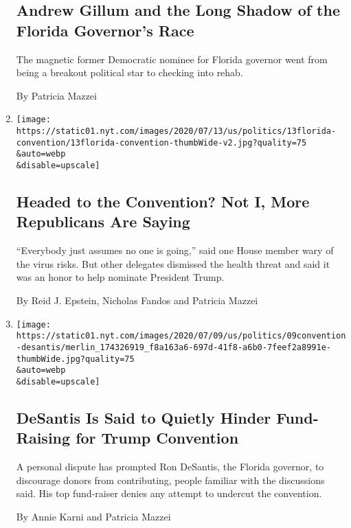 \begin{enumerate}
  \hypertarget{andrew-gillum-and-the-long-shadow-of-the-florida-governors-race}{%
  \subsection{Andrew Gillum and the Long Shadow of the Florida
  Governor's
  Race}\label{andrew-gillum-and-the-long-shadow-of-the-florida-governors-race}}

  The magnetic former Democratic nominee for Florida governor went from
  being a breakout political star to checking into rehab.

  By Patricia Mazzei
\item
  \href{/2020/07/13/us/politics/florida-virus-republican-convention.html}{}

  \texttt{[image: https://static01.nyt.com/images/2020/07/13/us/politics/13florida-convention/13florida-convention-thumbWide-v2.jpg?quality=75\\\&auto=webp\\\&disable=upscale]}

  \hypertarget{headed-to-the-convention-not-i-more-republicans-are-saying}{%
  \subsection{Headed to the Convention? Not I, More Republicans Are
  Saying}\label{headed-to-the-convention-not-i-more-republicans-are-saying}}

  ``Everybody just assumes no one is going,'' said one House member wary
  of the virus risks. But other delegates dismissed the health threat
  and said it was an honor to help nominate President Trump.

  By Reid J. Epstein, Nicholas Fandos and Patricia Mazzei
\item
  \href{/2020/07/09/us/politics/trump-florida-convention-desantis.html}{}

  \texttt{[image: https://static01.nyt.com/images/2020/07/09/us/politics/09convention-desantis/merlin\_174326919\_f8a163a6-697d-41f8-a6b0-7feef2a8991e-thumbWide.jpg?quality=75\\\&auto=webp\\\&disable=upscale]}

  \hypertarget{desantis-is-said-to-quietly-hinder-fund-raising-for-trump-convention}{%
  \subsection{DeSantis Is Said to Quietly Hinder Fund-Raising for Trump
  Convention}\label{desantis-is-said-to-quietly-hinder-fund-raising-for-trump-convention}}

  A personal dispute has prompted Ron DeSantis, the Florida governor, to
  discourage donors from contributing, people familiar with the
  discussions said. His top fund-raiser denies any attempt to undercut
  the convention.

  By Annie Karni and Patricia Mazzei
\end{enumerate}

